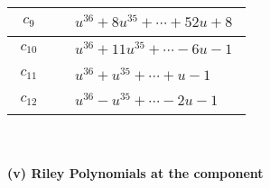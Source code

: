 \documentclass[1p]{elsarticle_modified}
\theoremstyle{definition}
\begin{document}
\begin{tabular}{m{50pt}|m{274pt}}
\hline $$\begin{aligned}c_{9}\end{aligned}$$&$\begin{aligned}
&u^{36}+8 u^{35}+\cdots+52 u+8
\end{aligned}$\\
\hline $$\begin{aligned}c_{10}\end{aligned}$$&$\begin{aligned}
&u^{36}+11 u^{35}+\cdots-6 u-1
\end{aligned}$\\
\hline $$\begin{aligned}c_{11}\end{aligned}$$&$\begin{aligned}
&u^{36}+u^{35}+\cdots+u-1
\end{aligned}$\\
\hline $$\begin{aligned}c_{12}\end{aligned}$$&$\begin{aligned}
&u^{36}- u^{35}+\cdots-2 u-1
\end{aligned}$\\
\hline
\end{tabular}\\~\\
\newpage\renewcommand{\arraystretch}{1}
\flushleft \textbf{(v) Riley Polynomials at the component}\newline \\
\end{document}
